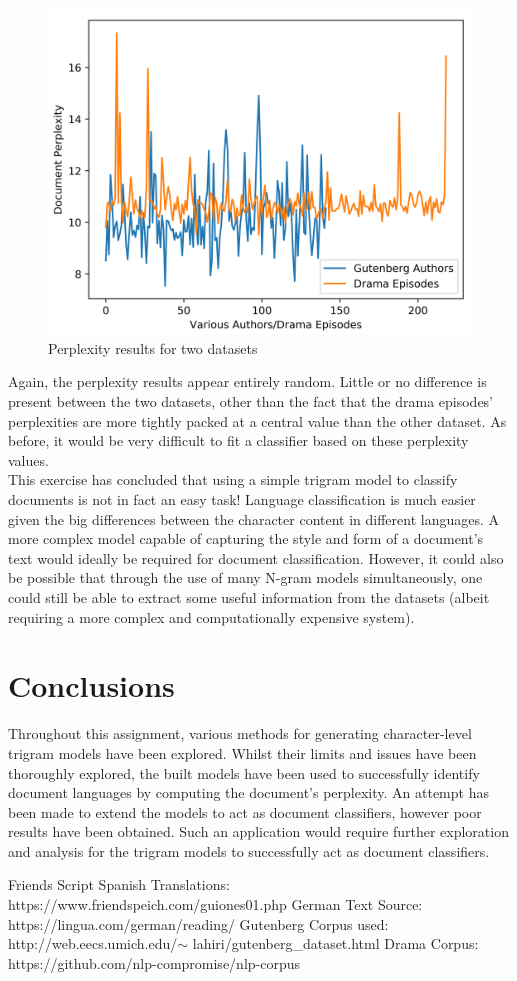 \documentclass[12pt]{article}
\begin{document}
\begin{figure}[H]
	\centering
	\includegraphics[width=0.8\linewidth]{graphics/authors_vs_friends}
	\caption{Perplexity results for two datasets}
	\label{fig:authorsvsfriends}
\end{figure}

Again, the perplexity results appear entirely random.  Little or no difference is present between the two datasets, other than the fact that the drama episodes' perplexities are more tightly packed at a central value than the other dataset.  As before, it would be very difficult to fit a classifier based on these perplexity values.\\
\hfill\break
This exercise has concluded that using a simple trigram model to classify documents is not in fact an easy task!  Language classification is much easier given the big differences between the character content in different languages.  A more complex model capable of capturing the style and form of a document's text would ideally be required for document classification.  However, it could also be possible that through the use of many N-gram models simultaneously, one could still be able to extract some useful information from the datasets (albeit requiring a more complex and computationally expensive system).

\section{Conclusions}
Throughout this assignment, various methods for generating character-level trigram models have been explored.  Whilst their limits and issues have been thoroughly explored, the built models have been used to successfully identify document languages by computing the document's perplexity.  An attempt has been made to extend the models to act as document classifiers, however poor results have been obtained.  Such an application would require further exploration and analysis for the trigram models to successfully act as document classifiers.

\begin{thebibliography}{4}
	  Friends Script Spanish Translations: https://www.friendspeich.com/guiones01.php
German Text Source: https://lingua.com/german/reading/
 Gutenberg Corpus used: http://web.eecs.umich.edu/$\sim$ lahiri/gutenberg\_dataset.html
 Drama Corpus: https://github.com/nlp-compromise/nlp-corpus
\end{thebibliography}
\end{document}
